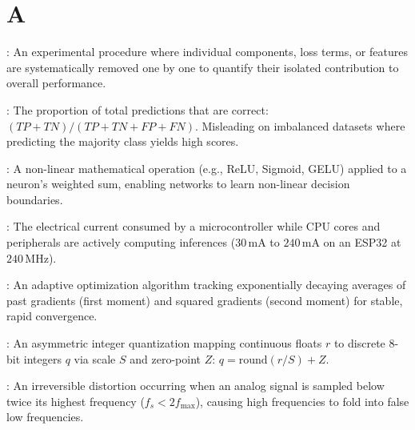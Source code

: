 \vspace{1em}

\section*{A}
\begin{description}[leftmargin=!,labelwidth=4.5cm,itemsep=1.5ex]
\item[\textbf{Ablation Study}\hfill \textnormal{\sffamily\scriptsize\color{keyideablue}[Research]}]: An experimental procedure where individual components, loss terms, or features are systematically removed one by one to quantify their isolated contribution to overall performance.
\item[\textbf{Accuracy}\hfill \textnormal{\sffamily\scriptsize\color{keyideablue}[Evaluation]}]: The proportion of total predictions that are correct: $(TP + TN) / (TP + TN + FP + FN)$. Misleading on imbalanced datasets where predicting the majority class yields high scores.
\item[\textbf{Activation Function}\hfill \textnormal{\sffamily\scriptsize\color{keyideablue}[Deep Learning]}]: A non-linear mathematical operation (e.g., ReLU, Sigmoid, GELU) applied to a neuron's weighted sum, enabling networks to learn non-linear decision boundaries.
\item[\textbf{Active Current}\hfill \textnormal{\sffamily\scriptsize\color{keyideablue}[IoT \& Hardware]}]: The electrical current consumed by a microcontroller while CPU cores and peripherals are actively computing inferences ($30\,\text{mA}$ to $240\,\text{mA}$ on an ESP32 at $240\,\text{MHz}$).
\item[\textbf{Adam Optimizer}\hfill \textnormal{\sffamily\scriptsize\color{keyideablue}[Deep Learning]}]: An adaptive optimization algorithm tracking exponentially decaying averages of past gradients (first moment) and squared gradients (second moment) for stable, rapid convergence.
\item[\textbf{Affine Quantization}\hfill \textnormal{\sffamily\scriptsize\color{keyideablue}[TinyML]}]: An asymmetric integer quantization mapping continuous floats $r$ to discrete 8-bit integers $q$ via scale $S$ and zero-point $Z$: $q = \text{round}(r / S) + Z$.
\item[\textbf{Aliasing}\hfill \textnormal{\sffamily\scriptsize\color{keyideablue}[Signal Processing]}]: An irreversible distortion occurring when an analog signal is sampled below twice its highest frequency ($f_s < 2 f_{\max}$), causing high frequencies to fold into false low frequencies.

\end{description}
